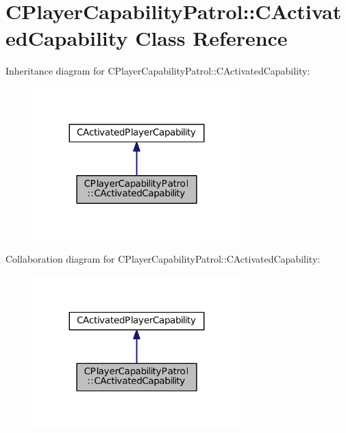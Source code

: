 \hypertarget{classCPlayerCapabilityPatrol_1_1CActivatedCapability}{}\section{C\+Player\+Capability\+Patrol\+:\+:C\+Activated\+Capability Class Reference}
\label{classCPlayerCapabilityPatrol_1_1CActivatedCapability}


Inheritance diagram for C\+Player\+Capability\+Patrol\+:\+:C\+Activated\+Capability\+:\nopagebreak
\begin{figure}[H]
\begin{center}
\leavevmode
\includegraphics[width=227pt]{classCPlayerCapabilityPatrol_1_1CActivatedCapability__inherit__graph}
\end{center}
\end{figure}


Collaboration diagram for C\+Player\+Capability\+Patrol\+:\+:C\+Activated\+Capability\+:\nopagebreak
\begin{figure}[H]
\begin{center}
\leavevmode
\includegraphics[width=227pt]{classCPlayerCapabilityPatrol_1_1CActivatedCapability__coll__graph}
\end{center}
\end{figure}
